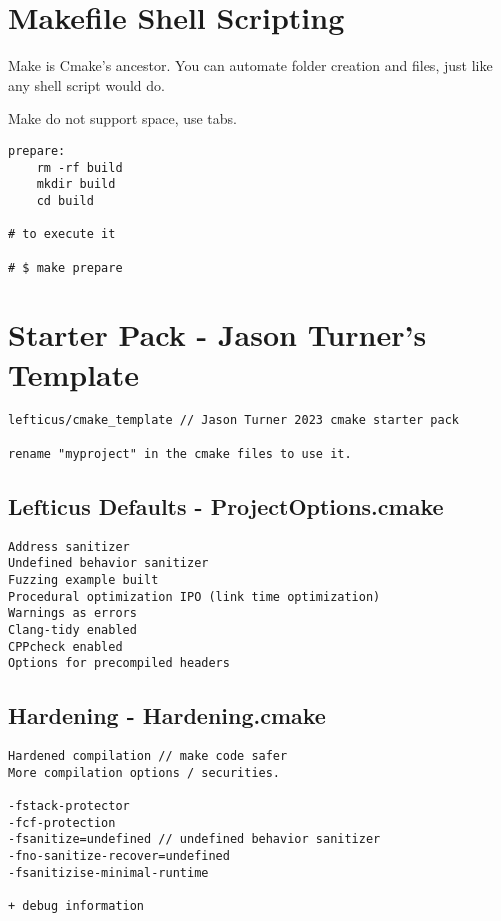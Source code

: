 \section{Makefile Shell Scripting}

Make is Cmake's ancestor. You can automate folder creation and files, just like any shell script would do. 

Make do not support space, use tabs.

\begin{verbatim}
prepare:
    rm -rf build
    mkdir build
    cd build

# to execute it

# $ make prepare
\end{verbatim}


\section{Starter Pack - Jason Turner's Template}

\begin{verbatim}
lefticus/cmake_template // Jason Turner 2023 cmake starter pack

rename "myproject" in the cmake files to use it.
\end{verbatim}

\subsection{Lefticus Defaults - ProjectOptions.cmake}

\begin{verbatim}
Address sanitizer
Undefined behavior sanitizer
Fuzzing example built
Procedural optimization IPO (link time optimization)
Warnings as errors
Clang-tidy enabled
CPPcheck enabled
Options for precompiled headers
\end{verbatim}

\subsection{Hardening - Hardening.cmake}

\begin{verbatim}
Hardened compilation // make code safer
More compilation options / securities.

-fstack-protector
-fcf-protection
-fsanitize=undefined // undefined behavior sanitizer
-fno-sanitize-recover=undefined
-fsanitizise-minimal-runtime

+ debug information 
\end{verbatim}

